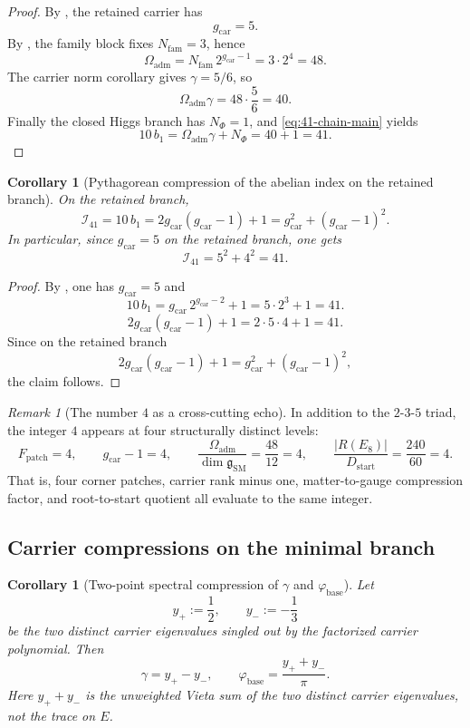 \documentclass[11pt,a4paper]{article}
\newtheorem{corollary}[theorem]{Corollary}
\theoremstyle{definition}
\theoremstyle{remark}
\newtheorem*{remark}{Remark}
\newcommand{\phibase}{\varphi_{\mathrm{base}}}
\newcommand{\bone}{b_1}
\newcommand{\SM}{\mathrm{SM}}
\newcommand{\Oadm}{\Omega_{\mathrm{adm}}}
\newcommand{\gcar}{g_{\mathrm{car}}}
\newcommand{\Dstart}{D_{\mathrm{start}}}
\begin{document}
\begin{proof}
By , the retained carrier has
\[
\gcar=5.
\]
By , the family block fixes $N_{\mathrm{fam}}=3$, hence
\[
\Oadm=N_{\mathrm{fam}}\,2^{\gcar-1}=3\cdot 2^4=48.
\]
The carrier norm corollary gives $\gamma=5/6$, so
\[
\Oadm\gamma=48\cdot\frac56=40.
\]
Finally the closed Higgs branch has $N_\Phi=1$, and \eqref{eq:41-chain-main} yields
\[
10\,\bone=\Oadm\gamma+N_\Phi=40+1=41.
\]
\end{proof}

\begin{corollary}[Pythagorean compression of the abelian index on the retained branch]
\label{cor:pythagorean-integrity-index}
On the retained branch,
\[
\mathcal I_{41}
=
10\,\bone
=
2\gcar(\gcar-1)+1
=
\gcar^2+(\gcar-1)^2.
\]
In particular, since $\gcar=5$ on the retained branch, one gets
\[
\mathcal I_{41}=5^2+4^2=41.
\]
\end{corollary}

\begin{proof}
By , one has $\gcar=5$ and
\[
10\,\bone=\gcar\,2^{\gcar-2}+1=5\cdot 2^3+1=41.
\]
\[
2\gcar(\gcar-1)+1=2\cdot 5\cdot 4+1=41.
\]
Since on the retained branch
\[
2\gcar(\gcar-1)+1=\gcar^2+(\gcar-1)^2,
\]
the claim follows.
\end{proof}

\begin{remark}[The number $4$ as a cross-cutting echo]
In addition to the $2$-$3$-$5$ triad, the integer $4$ appears at four structurally distinct levels:
\[
F_{\mathrm{patch}}=4,
\qquad
\gcar-1=4,
\qquad
\frac{\Oadm}{\dim\mathfrak g_{\SM}}=\frac{48}{12}=4,
\qquad
\frac{|R(E_8)|}{\Dstart}=\frac{240}{60}=4.
\]
That is, four corner patches, carrier rank minus one, matter-to-gauge compression factor, and root-to-start quotient all evaluate to the same integer.
\end{remark}

\subsection{Carrier compressions on the minimal branch}

\begin{corollary}[Two-point spectral compression of $\gamma$ and $\phibase$]
Let
\[
y_+:=\frac12,
\qquad
y_-:=-\frac13
\]
be the two distinct carrier eigenvalues singled out by the factorized carrier polynomial. Then
\[
\gamma=y_+-y_-,
\qquad
\phibase=\frac{y_++y_-}{\pi}.
\]
Here $y_++y_-$ is the unweighted Vieta sum of the two distinct carrier eigenvalues, not the trace on $E$.
\end{corollary}
\end{document}
